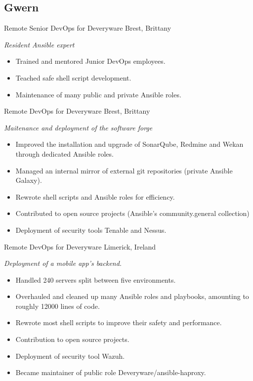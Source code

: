 \documentclass[hidelinks]{friggeri-cv} %
\begin{document}
\subsection{Gwern}
\begin{entrylist}
 {Remote Senior DevOps for Deveryware} {Brest, Brittany} {
  \emph{Resident Ansible expert}
  \begin{itemize}
    \item Trained and mentored Junior DevOps employees.
    \item Teached safe shell script development.
    \item Maintenance of many public and private Ansible roles.
  \end{itemize}
}
 {Remote DevOps for Deveryware} {Brest, Brittany} {
  \emph{Maitenance and deployment of the software forge}
  \begin{itemize}
    \item Improved the installation and upgrade of SonarQube, Redmine and Wekan through dedicated Ansible roles.
    \item Managed an internal mirror of external git repositories (private Ansible Galaxy).
    \item Rewrote shell scripts and Ansible roles for efficiency.
    \item Contributed to open source projects (Ansible's community.general collection)
    \item Deployment of security tools Tenable and Nessus.
  \end{itemize}
}
 {Remote DevOps for Deveryware} {Limerick, Ireland} {
  \emph{Deployment of a mobile app's backend.}
  \begin{itemize}
    \item Handled 240 servers split between five environments.
    \item Overhauled and cleaned up many Ansible roles and playbooks, amounting to roughly 12000 lines of code.
    \item Rewrote most shell scripts to improve their safety and performance.
    \item Contribution to open source projects.
    \item Deployment of security tool Wazuh.
    \item Became maintainer of public role Deveryware/ansible-haproxy.

\end{itemize}}
\end{entrylist}
\end{document}
